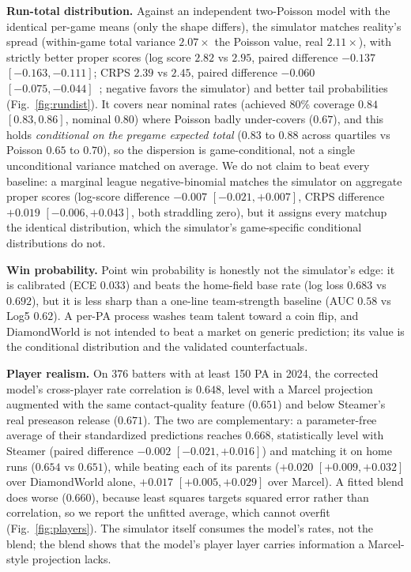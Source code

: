 \documentclass[10pt,twocolumn]{article}
\begin{document}
\textbf{Run-total distribution.} Against an independent two-Poisson model with the identical per-game
means (only the shape differs), the simulator matches reality's spread (within-game total variance
$2.07\times$ the Poisson value, real $2.11\times$), with strictly better proper scores (log score $2.82$
vs $2.95$, paired difference $-0.137$ $[-0.163,-0.111]$; CRPS $2.39$ vs $2.45$, paired difference
$-0.060$ $[-0.075,-0.044]$~\cite{gneiting,czado}; negative favors the simulator) and better tail
probabilities (Fig.~\ref{fig:rundist}). It covers near nominal rates (achieved 80\% coverage $0.84$
$[0.83,0.86]$, nominal $0.80$) where Poisson badly under-covers ($0.67$), and this holds
\emph{conditional on the pregame expected total} ($0.83$ to $0.88$ across quartiles vs Poisson $0.65$ to
$0.70$), so the dispersion is game-conditional, not a single unconditional variance matched on average.
We do not claim to beat every baseline: a marginal league negative-binomial matches the simulator on
aggregate proper scores (log-score difference $-0.007$ $[-0.021,+0.007]$, CRPS difference $+0.019$
$[-0.006,+0.043]$, both straddling zero), but it assigns every matchup the identical distribution,
which the simulator's game-specific conditional distributions do not.

\textbf{Win probability.} Point win probability is honestly not the simulator's edge: it is calibrated
(ECE $0.033$) and beats the home-field base rate (log loss $0.683$ vs $0.692$), but it is less sharp
than a one-line team-strength baseline (AUC $0.58$ vs Log5 $0.62$). A per-PA process washes team talent
toward a coin flip, and DiamondWorld is not intended to beat a market on generic prediction; its value
is the conditional distribution and the validated counterfactuals.

\textbf{Player realism.} On 376 batters with at least 150 PA in 2024, the corrected model's cross-player
rate correlation is $0.648$, level with a Marcel projection augmented with the same contact-quality
feature ($0.651$) and below Steamer's real preseason release ($0.671$). The two are complementary: a
parameter-free average of their standardized predictions reaches $0.668$, statistically level with
Steamer (paired difference $-0.002$ $[-0.021,+0.016]$) and matching it on home runs ($0.654$ vs
$0.651$), while beating each of its parents ($+0.020$ $[+0.009,+0.032]$ over DiamondWorld alone,
$+0.017$ $[+0.005,+0.029]$ over Marcel). A fitted blend does worse ($0.660$), because least squares
targets squared error rather than correlation, so we report the unfitted average, which cannot
overfit (Fig.~\ref{fig:players}). The simulator itself consumes the model's rates, not the blend; the
blend shows that the model's player layer carries information a Marcel-style projection lacks.
\end{document}
